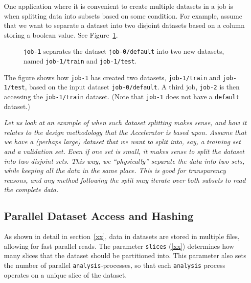 One application where it is convenient to create multiple datasets in
a job is when splitting data into subsets based on some condition.
For example, assume that we want to separate a dataset into two
disjoint datasets based on a column storing a boolean value.  See
Figure~\ref{fig:dep_dataset_csvimport_chain}.

\begin{figure}[h!]
  \hspace{1cm}
  
  \caption{\texttt{job-1} separates the dataset
    \texttt{job-0/default} into two new datasets, named
    \texttt{job-1/train} and \texttt{job-1/test}.}
  \label{fig:dep_dataset_csvimport_chain}
\end{figure}

The figure shows how \texttt{job-1} has created two datasets,
\texttt{job-1/train} and \texttt{job-1/test}, based on the input
dataset \texttt{job-0/default}.  A third job, \texttt{job-2} is then
accessing the \texttt{job-1/train} dataset.  (Note that \texttt{job-1}
does not have a \texttt{default} dataset.)




\emph{
  Let us look at an example of when such dataset splitting
  makes sense, and how it relates to the design methodology that the
  Accelerator is based upon.  Assume that we have a (perhaps large)
  dataset that we want to split into, say, a training set and a
  validation set.  Even if one set is small, it makes sense to split the
  dataset into two disjoint sets.  This way, we ``physically'' separate
  the data into two sets, while keeping all the data in the same place.
  This is good for transparency reasons, and any method following the
  split may iterate over both subsets to read the complete data.
}


\subsection{Parallel Dataset Access and Hashing}
As shown in detail in section~\ref{xx}, data in datasets are stored in
multiple files, allowing for fast parallel reads.  The parameter
\texttt{slices} (\ref{xx}) determines how many slices that the dataset
should be partitioned into.  This parameter also sets the number of
parallel \texttt{analysis}-processes, so that each \texttt{analysis}
process operates on a unique slice of the dataset.

